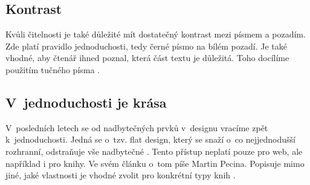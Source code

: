 \documentclass[11pt, a4paper]{article}
\begin{document}
\subsection{Kontrast}
Kvůli čitelnosti je také důležité mít dostatečný kontrast mezi písmem a pozadím. Zde platí pravidlo jednoduchosti, tedy černé písmo na bílém pozadí. Je také vhodné, aby čtenář ihned poznal, která část textu je důležitá. Toho docílíme použitím tučného písma \cite{Brda2016}.

\subsection{V~jednoduchosti je krása}
V~posledních letech se od nadbytečných prvků v~designu vracíme zpět k~jednoduchosti. Jedná se o~tzv. flat design, který se snaží o~co nejjednodušší rozhranní, odstraňuje vše nadbytečné \cite{Uhlirova2016}.
Tento přístup neplatí pouze pro web, ale například i pro knihy. Ve svém článku o~tom píše Martin Pecina. Popisuje mimo jiné, jaké vlastnosti je vhodné zvolit pro konkrétní typy knih \cite{Pecina2015}.


    \newpage
	
	\renewcommand{\refname}{Literatura}
	
\end{document}
